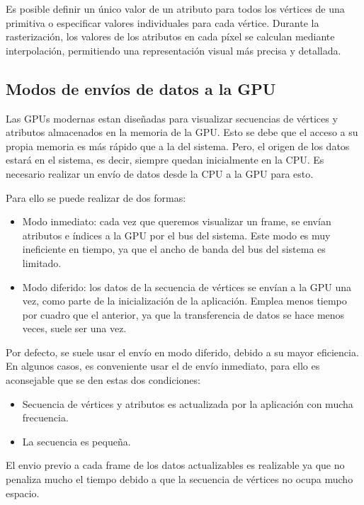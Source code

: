 \documentclass[12pt]{report} %
\providecommand{\tightlist}{%
  \setlength{\itemsep}{0pt}\setlength{\parskip}{0pt}}
\begin{document}
Es posible definir un único valor de un atributo para todos los vértices
de una primitiva o especificar valores individuales para cada vértice.
Durante la rasterización, los valores de los atributos en cada píxel se
calculan mediante interpolación, permitiendo una representación visual
más precisa y detallada.

\hypertarget{modos-de-envuxedos-de-datos-a-la-gpu}{%
\subsection{Modos de envíos de datos a la
GPU}\label{modos-de-envuxedos-de-datos-a-la-gpu}}

Las GPUs modernas estan diseñadas para visualizar secuencias de vértices
y atributos almacenados en la memoria de la GPU. Esto se debe que el
acceso a su propia memoria es más rápido que a la del sistema. Pero, el
origen de los datos estará en el sistema, es decir, siempre quedan
inicialmente en la CPU. Es necesario realizar un envío de datos desde la
CPU a la GPU para esto.

Para ello se puede realizar de dos formas:

\begin{itemize}
\tightlist
\item
  Modo inmediato: cada vez que queremos visualizar un frame, se envían
  atributos e índices a la GPU por el bus del sistema. Este modo es muy
  ineficiente en tiempo, ya que el ancho de banda del bus del sistema es
  limitado.
\item
  Modo diferido: los datos de la secuencia de vértices se envían a la
  GPU una vez, como parte de la inicialización de la aplicación. Emplea
  menos tiempo por cuadro que el anterior, ya que la transferencia de
  datos se hace menos veces, suele ser una vez.
\end{itemize}

Por defecto, se suele usar el envío en modo diferido, debido a su mayor
eficiencia. En algunos casos, es conveniente usar el de envío inmediato,
para ello es aconsejable que se den estas dos condiciones:

\begin{itemize}
\tightlist
\item
  Secuencia de vértices y atributos es actualizada por la aplicación con
  mucha frecuencia.
\item
  La secuencia es pequeña.
\end{itemize}

El envio previo a cada frame de los datos actualizables es realizable ya
que no penaliza mucho el tiempo debido a que la secuencia de vértices no
ocupa mucho espacio.
\end{document}
